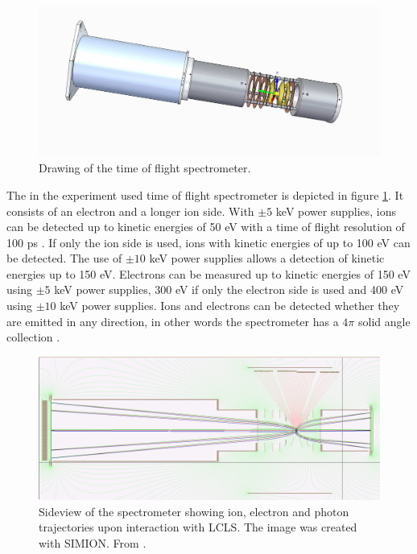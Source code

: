 \begin{figure}
   \includegraphics[width=1.\linewidth]{images/spectrometer.jpg}
    \caption{Drawing of the time of flight spectrometer.}
\label{fig:spectrometer-detail}
\end{figure}
The in the experiment used time of flight spectrometer is depicted in figure \ref{fig:spectrometer-detail}. It consists of an electron and a longer ion side. With $\pm 5$ keV power supplies, ions can be detected up to kinetic energies of 50 eV with a time of flight resolution of 100 ps \citep{Ferguson-2015-JSR}. If only the ion side is used, ions with kinetic energies of up to 100 eV can be detected. The use of $\pm 10$ keV power supplies allows a detection of kinetic energies up to 150 eV. Electrons can be measured up to kinetic energies of 150 eV using $\pm 5$ keV power supplies, 300 eV if only the electron side is used and 400 eV using $\pm 10$ keV power supplies. Ions and electrons can be detected whether they are emitted in any direction, in other words the spectrometer has a $4\pi$ solid angle collection \citep{Osipov-2013-PC}.
\begin{figure}
   \includegraphics[width=1.\linewidth]{images/simion.jpg}
    \caption[Sideview of the spectrometer showing ion, electron and photon trajectories.]{Sideview of the spectrometer showing ion, electron and photon trajectories upon interaction with LCLS. The image was created with SIMION. From \citep{Osipov-2013-PC}.}
\label{fig:simion}
\end{figure}
